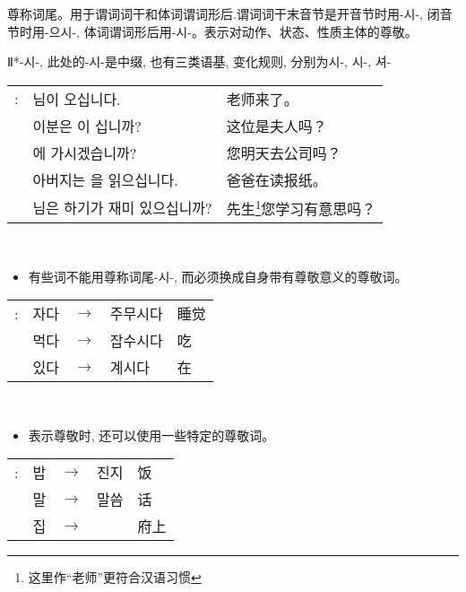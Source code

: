\begin{grammar}
    \begin{grammarsect}[\kr -(으){}시-]\label{gram:si}
        \begin{itemize}
            \item 尊称词尾。用于谓词词干和体词谓词形后.谓词词干末音节是开音节时用{\kr -시-}, 闭音节时用{\kr -으시-}, 体词谓词形后用{\kr -시-}。表示对动作、状态、性质主体的尊敬。
            {\color{gray} \item Ⅱ*{\kr -시-}, 此处的{\kr -시-}是中缀, 也有三类语基, 变化规则, 分别为{\kr 시-, 시-, 셔-}}
        \end{itemize}
        \begin{tabular}{lll}
            \kr \ruby{例}{예}: &\kr \ruby{先生}{선생}님이 오십니다.&老师来了。\\
            &\kr 이분은 \ruby{夫人}{부인}이 십니까?&这位是夫人吗？\\ 
            &\kr \ruby{來日}{내일} \ruby{會社}{회사}에 가시겠습니까?&您明天去公司吗？\\
            &\kr 아버지는 \ruby{新聞}{신문}을 읽으십니다.&爸爸在读报纸。\\
            &\kr \ruby{先生}{선생}님은 \ruby{工夫}{공부}하기가 재미 있으십니까?&先生\footnote{这里作“老师”更符合汉语习惯}您学习有意思吗？
        \end{tabular}\\
        \begin{itemize}
            \item 有些词不能用尊称词尾{\kr -시-}, 而必须换成自身带有尊敬意义的尊敬词。
        \end{itemize}
        \begin{tabular}{lllll}
            \kr \ruby{例}{예}: &\kr 자다&$\to$&\kr 주무시다&睡觉\\
            &\kr 먹다 &$\to$&\kr 잡수시다&吃\\
            &\kr 있다 &$\to$&\kr 계시다&在
        \end{tabular}\\
        \begin{itemize}
            \item 表示尊敬时, 还可以使用一些特定的尊敬词。
        \end{itemize}
        \begin{tabular}{lllll}
            \kr \ruby{例}{예}: &\kr 밥&$\to$& \kr 진지& 饭\\
            &\kr 말&$\to$&\kr 말씀& 话\\
            &\kr 집&$\to$& \kr \ruby{宅}{댁}& 府上

\end{tabular}
\end{grammarsect}
\end{grammar}
